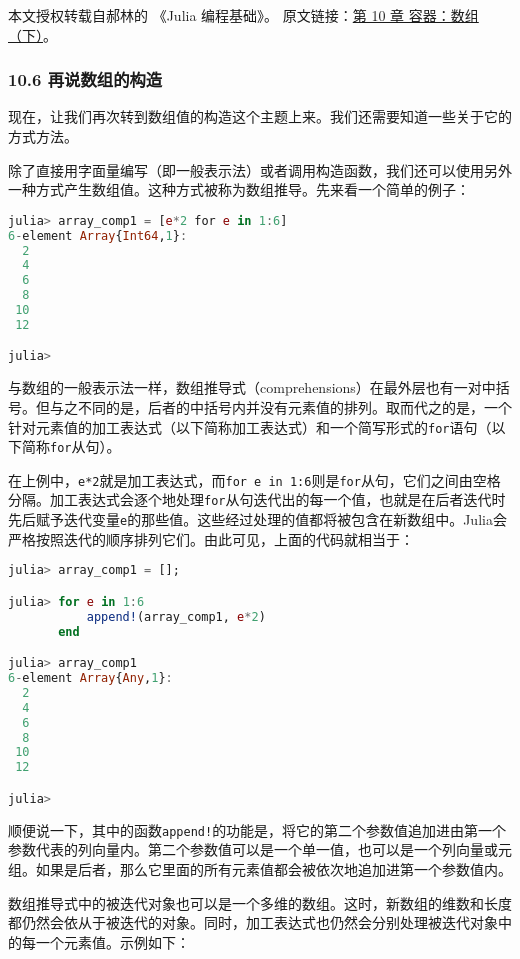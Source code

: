 
本文授权转载自郝林的 《Julia 编程基础》。 原文链接：\href{https://github.com/hyper0x/JuliaBasics/blob/master/book/ch10.md}{第 10 章 容器：数组（下）}。

\subsubsection{10.6 再说数组的构造}

现在，让我们再次转到数组值的构造这个主题上来。我们还需要知道一些关于它的方式方法。

除了直接用字面量编写（即一般表示法）或者调用构造函数，我们还可以使用另外一种方式产生数组值。这种方式被称为数组推导。先来看一个简单的例子：

\begin{lstlisting}[language=julia]
julia> array_comp1 = [e*2 for e in 1:6]
6-element Array{Int64,1}:
  2
  4
  6
  8
 10
 12

julia> 
\end{lstlisting}

与数组的一般表示法一样，数组推导式（comprehensions）在最外层也有一对中括号。但与之不同的是，后者的中括号内并没有元素值的排列。取而代之的是，一个针对元素值的加工表达式（以下简称加工表达式）和一个简写形式的\verb`for`语句（以下简称\verb`for`从句）。

在上例中，\verb`e*2`就是加工表达式，而\verb`for e in 1:6`则是\verb`for`从句，它们之间由空格分隔。加工表达式会逐个地处理\verb`for`从句迭代出的每一个值，也就是在后者迭代时先后赋予迭代变量\verb`e`的那些值。这些经过处理的值都将被包含在新数组中。Julia会严格按照迭代的顺序排列它们。由此可见，上面的代码就相当于：

\begin{lstlisting}[language=julia]
julia> array_comp1 = [];

julia> for e in 1:6
           append!(array_comp1, e*2)
       end

julia> array_comp1
6-element Array{Any,1}:
  2
  4
  6
  8
 10
 12

julia>  
\end{lstlisting}

顺便说一下，其中的函数\verb`append!`的功能是，将它的第二个参数值追加进由第一个参数代表的列向量内。第二个参数值可以是一个单一值，也可以是一个列向量或元组。如果是后者，那么它里面的所有元素值都会被依次地追加进第一个参数值内。

数组推导式中的被迭代对象也可以是一个多维的数组。这时，新数组的维数和长度都仍然会依从于被迭代的对象。同时，加工表达式也仍然会分别处理被迭代对象中的每一个元素值。示例如下：

